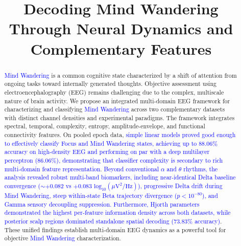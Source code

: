 \documentclass[conference]{IEEEtran}
\begin{document}
\title{Decoding Mind Wandering Through Neural Dynamics and Complementary Features\vspace{-4mm}
}

\author{

}

\maketitle

\begin{abstract}
\textcolor{blue}{Mind Wandering} is a common cognitive state characterized by a shift of attention from ongoing tasks toward internally generated thoughts. Objective assessment using electroencephalography (EEG) remains challenging due to the complex, multiscale nature of brain activity. We propose an integrated multi-domain EEG framework for characterizing and classifying \textcolor{blue}{Mind Wandering} across two complementary datasets with distinct channel densities and experimental paradigms. The framework integrates spectral, temporal, complexity, entropy, amplitude-envelope, and functional connectivity features. On pooled epoch data, \textcolor{blue}{simple linear models proved good enough to effectively classify Focus and Mind Wandering states, achieving up to $88.06\%$ accuracy on high-density EEG and performing on par with a deep multilayer perceptron ($86.06\%$), demonstrating that classifier complexity is secondary to rich multi-domain feature representation}. \textcolor{blue}{Beyond conventional $\alpha$ and $\theta$ rhythms, the analysis revealed robust multi-band biomarkers, including near-identical Delta baseline convergence ($\sim+0.082$ vs $+0.083\text{ log}_{10}(\mu\text{V}^2/\text{Hz})$), progressive Delta drift during Mind Wandering, steep within-state Beta trajectory divergence ($p < 10^{-80}$), and Gamma sensory decoupling suppression. Furthermore, Hjorth parameters demonstrated the highest per-feature information density across both datasets, while posterior scalp regions dominated standalone spatial decoding ($73.83\%$ accuracy)}. These unified findings establish multi-domain EEG dynamics as a powerful tool for objective \textcolor{blue}{Mind Wandering} characterization.
\end{abstract}
\end{document}
